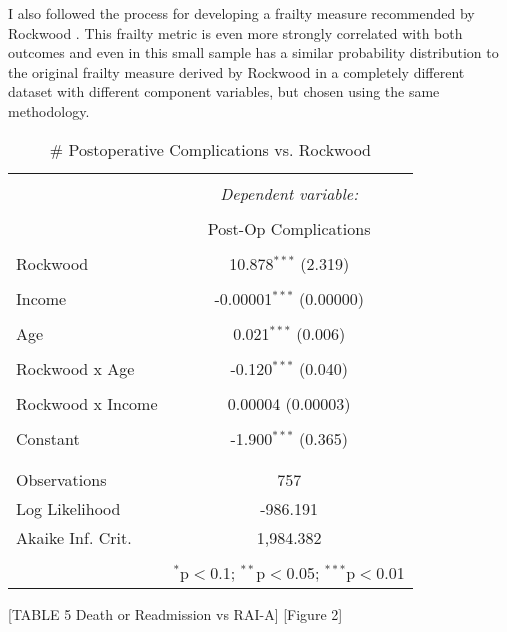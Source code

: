 
I also followed the process for developing a frailty measure recommended by Rockwood \cite{Rockwood_2005}. This frailty metric is even more strongly correlated with both outcomes and even in this small sample has a similar probability distribution to the original frailty measure derived by Rockwood \cite{Mitnitski_2001} in a completely different dataset with different component variables, but chosen using the same methodology.

\begin{table}\centering 
  \caption{ # Postoperative Complications vs. Rockwood }\label{wrap-tab:4} 
\begin{tabular}{@{\extracolsep{5pt}}lc} 
\\[-1.8ex]\hline 
\hline \\[-1.8ex] 
 & \multicolumn{1}{c}{\textit{Dependent variable:}} \\ 
\cline{2-2} 
\\[-1.8ex] & {Post-Op Complications} \\ 
\hline \\[-1.8ex] 
 Rockwood & 10.878$^{***}$ (2.319) \\ 
  & \\ 
 Income & -0.00001$^{***}$ (0.00000) \\ 
  & \\ 
 Age & 0.021$^{***}$ (0.006) \\ 
  & \\ 
 Rockwood x Age & -0.120$^{***}$ (0.040) \\ 
  & \\ 
 Rockwood x Income & 0.00004 (0.00003) \\ 
  & \\ 
 Constant & -1.900$^{***}$ (0.365) \\ 
  & \\ 
\hline \\[-1.8ex] 
Observations & \multicolumn{1}{c}{757} \\ 
Log Likelihood & \multicolumn{1}{c}{-986.191} \\ 
Akaike Inf. Crit. & \multicolumn{1}{c}{1,984.382} \\ 
\hline 
\hline \\[-1.8ex] 
  & \multicolumn{1}{r}{$^{*}$p$<$0.1; $^{**}$p$<$0.05; $^{***}$p$<$0.01} \\ 
\end{tabular} 
\end{table} 

[TABLE 5 Death or Readmission vs RAI-A] [Figure 2]

